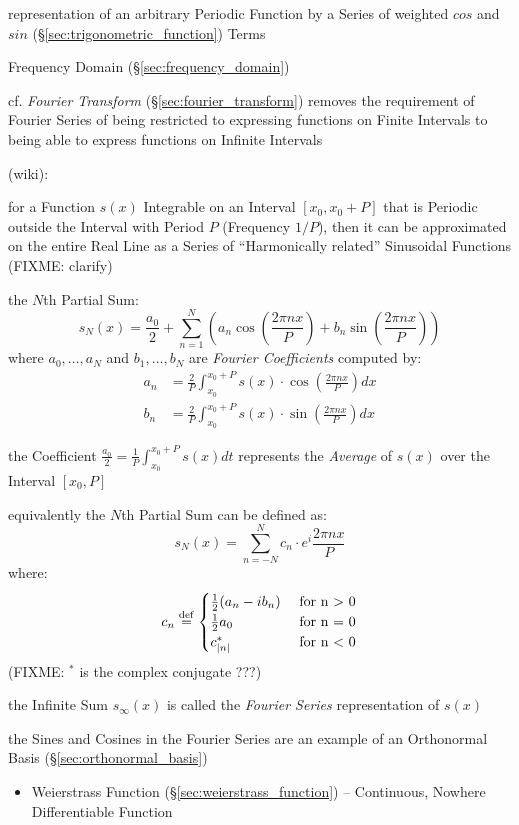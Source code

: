 representation of an arbitrary Periodic Function by a Series of weighted $cos$
and $sin$ (\S\ref{sec:trigonometric_function}) Terms

\fist Frequency Domain (\S\ref{sec:frequency_domain})

\fist cf. \emph{Fourier Transform} (\S\ref{sec:fourier_transform}) removes the
requirement of Fourier Series of being restricted to expressing functions on
Finite Intervals to being able to express functions on Infinite Intervals

(wiki):

for a Function $s(x)$ Integrable on an Interval $[x_0,x_0 + P]$ that is
Periodic outside the Interval with Period $P$ (Frequency $1/P$), then it can be
approximated on the entire Real Line as a Series of ``Harmonically related''
Sinusoidal Functions (FIXME: clarify)

the $N$th Partial Sum:
\[
  s_N(x) = \frac{a_0}{2} + \sum_{n=1}^N \left(
    a_n\cos(\frac{2\pi{nx}}{P}) + b_n\sin(\frac{2\pi{nx}}{P})
  \right)
\]
where $a_0,\ldots,a_N$ and $b_1,\ldots,b_N$ are \emph{Fourier Coefficients}
computed by:
\begin{align*}
  a_n & = \frac{2}{P}\int_{x_0}^{x_0+P}s(x) \cdot \cos(\frac{2\pi{nx}}{P}) dx \\
  b_n & = \frac{2}{P}\int_{x_0}^{x_0+P}s(x) \cdot \sin(\frac{2\pi{nx}}{P}) dx
\end{align*}

the Coefficient $\frac{a_0}{2} = \frac{1}{P}\int_{x_0}^{x_0+P}s(x)dt$
represents the \emph{Average} of $s(x)$ over the Interval $[x_0,P]$

equivalently the $N$th Partial Sum can be defined as:
\[
  s_N(x) = \sum_{n=-N}^N c_n \cdot e^i\frac{2\pi{nx}}{P}
\]
where:
\[
  c_n \stackrel{\mathrm{def}}= \begin{cases}
    \frac{1}{2}(a_n - ib_n) &\ \text{for n > 0} \\
    \frac{1}{2}a_0          &\ \text{for n = 0} \\
    c_{|n|}^*               &\ \text{for n < 0}
  \end{cases}
\]
(FIXME: $^*$ is the complex conjugate ???)

the Infinite Sum $s_\infty(x)$ is called the \emph{Fourier Series}
representation of $s(x)$

the Sines and Cosines in the Fourier Series are an example of an Orthonormal
Basis (\S\ref{sec:orthonormal_basis})

\begin{itemize}
  \item Weierstrass Function (\S\ref{sec:weierstrass_function}) -- Continuous,
    Nowhere Differentiable Function
\end{itemize}


